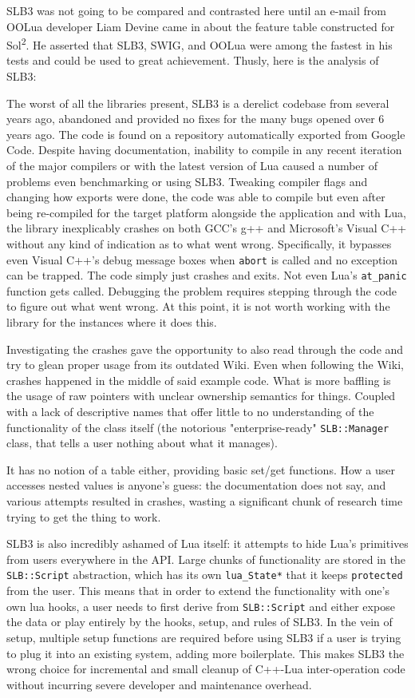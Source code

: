 \documentclass[conference,compsoc]{IEEEtran}
\newcommand{\soltwo}{Sol\textsuperscript{2}}
\begin{document}
SLB3 was not going to be compared and contrasted here until an e-mail from OOLua developer Liam Devine came in about the feature table constructed for \soltwo{}. He asserted that SLB3, SWIG, and OOLua were among the fastest in his tests and could be used to great achievement. Thusly, here is the analysis of SLB3:

The worst of all the libraries present, SLB3\cite{slb3} is a derelict codebase from several years ago, abandoned and provided no fixes for the many bugs opened over 6 years ago. The code is found on a repository automatically exported from Google Code. Despite having documentation, inability to compile in any recent iteration of the major compilers or with the latest version of Lua caused a number of problems even benchmarking or using SLB3. Tweaking compiler flags and changing how exports were done, the code was able to compile but even after being re-compiled for the target platform alongside the application and with Lua, the library inexplicably crashes on both GCC's g++ and Microsoft's Visual C++ without any kind of indication as to what went wrong. Specifically, it bypasses even Visual C++'s debug message boxes when \lstinline|abort| is called and no exception can be trapped. The code simply just crashes and exits. Not even Lua's \lstinline|at_panic| function gets called. Debugging the problem requires stepping through the code to figure out what went wrong. At this point, it is not worth working with the library for the instances where it does this.

Investigating the crashes gave the opportunity to also read through the code and try to glean proper usage from its outdated Wiki. Even when following the Wiki, crashes happened in the middle of said example code. What is more baffling is the usage of raw pointers with unclear ownership semantics for things. Coupled with a lack of descriptive names that offer little to no understanding of the functionality of the class itself (the notorious "enterprise-ready" \lstinline|SLB::Manager| class, that tells a user nothing about what it manages).

It has no notion of a table either, providing basic set/get functions. How a user accesses nested values is anyone's guess: the documentation does not say, and various attempts resulted in crashes, wasting a significant chunk of research time trying to get the thing to work.

SLB3 is also incredibly ashamed of Lua itself: it attempts to hide Lua's primitives from users everywhere in the API. Large chunks of functionality are stored in the \lstinline|SLB::Script| abstraction, which has its own \lstinline|lua_State*| that it keeps \lstinline|protected| from the user. This means that in order to extend the functionality with one's own lua hooks, a user needs to first derive from \lstinline|SLB::Script| and either expose the data or play entirely by the hooks, setup, and rules of SLB3. In the vein of setup, multiple setup functions are required before using SLB3 if a user is trying to plug it into an existing system, adding more boilerplate. This makes SLB3 the wrong choice for incremental and small cleanup of C++-Lua inter-operation code without incurring severe developer and maintenance overhead.
\end{document}
